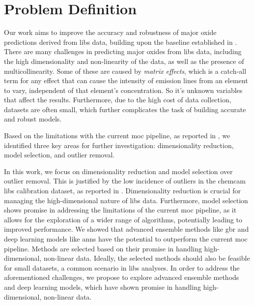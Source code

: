 \section{Problem Definition}
\label{sec:problem_definition}

Our work aims to improve the accuracy and robustness of major oxide predictions derived from \gls{libs} data, building upon the baseline established in \citet{p9_paper}.
There are many challenges in predicting major oxides from \gls{libs} data, including the high dimensionality and non-linearity of the data, as well as the presence of multicollinearity.
Some of these are caused by \textit{matrix effects}\cite{andersonImprovedAccuracyQuantitative2017}, which is a catch-all term for any effect that can cause the intensity of emission lines from an element to vary, independent of that element's concentration. So it's unknown variables that affect the results.
Furthermore, due to the high cost of data collection, datasets are often small, which further complicates the task of building accurate and robust models.

Based on the limitations with the current \gls{moc} pipeline, as reported in \citet{p9_paper}, we identified three key areas for further investigation: dimensionality reduction, model selection, and outlier removal.

In this work, we focus on dimensionality reduction and model selection over outlier removal.
This is justified by the low incidence of outliers in the \gls{chemcam} \gls{libs} calibration dataset, as reported in \citet{p9_paper}.
Dimensionality reduction is crucial for managing the high-dimensional nature of \gls{libs} data. %
Furthermore, model selection shows promise in addressing the limitations of the current \gls{moc} pipeline, as it allows for the exploration of a wider range of algorithms, potentially leading to improved performance.
We showed that advanced ensemble methods like \gls{gbr} and deep learning models like \gls{ann}s have the potential to outperform the current \gls{moc} pipeline.
Methods are selected based on their promise in handling high-dimensional, non-linear data. Ideally, the selected methods should also be feasible for small datasets, a common scenario in \gls{libs} analyses. 
In order to address the aforementioned challenges, we propose to explore advanced ensemble methods and deep learning models, which have shown promise in handling high-dimensional, non-linear data.

